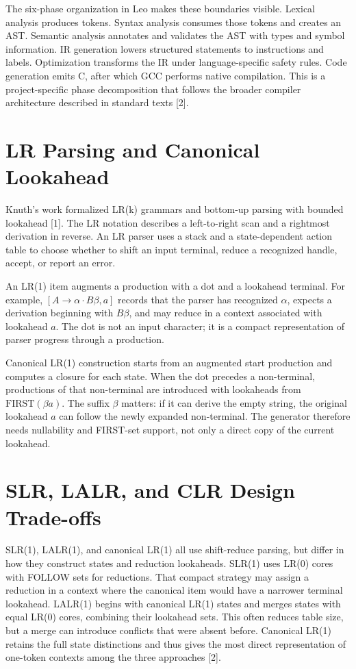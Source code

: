 \documentclass[12pt,a4paper,oneside]{report}
\begin{document}
The six-phase organization in Leo makes these boundaries visible. Lexical analysis produces tokens. Syntax analysis consumes those tokens and creates an AST. Semantic analysis annotates and validates the AST with types and symbol information. IR generation lowers structured statements to instructions and labels. Optimization transforms the IR under language-specific safety rules. Code generation emits C, after which GCC performs native compilation. This is a project-specific phase decomposition that follows the broader compiler architecture described in standard texts [2].

\section{LR Parsing and Canonical Lookahead}
Knuth's work formalized LR(k) grammars and bottom-up parsing with bounded lookahead [1]. The LR notation describes a left-to-right scan and a rightmost derivation in reverse. An LR parser uses a stack and a state-dependent action table to choose whether to shift an input terminal, reduce a recognized handle, accept, or report an error.

An LR(1) item augments a production with a dot and a lookahead terminal. For example, $[A\to\alpha\cdot B\beta,a]$ records that the parser has recognized $\alpha$, expects a derivation beginning with $B\beta$, and may reduce in a context associated with lookahead $a$. The dot is not an input character; it is a compact representation of parser progress through a production.

Canonical LR(1) construction starts from an augmented start production and computes a closure for each state. When the dot precedes a non-terminal, productions of that non-terminal are introduced with lookaheads from $\mathrm{FIRST}(\beta a)$. The suffix $\beta$ matters: if it can derive the empty string, the original lookahead $a$ can follow the newly expanded non-terminal. The generator therefore needs nullability and FIRST-set support, not only a direct copy of the current lookahead.

\section{SLR, LALR, and CLR Design Trade-offs}
SLR(1), LALR(1), and canonical LR(1) all use shift-reduce parsing, but differ in how they construct states and reduction lookaheads. SLR(1) uses LR(0) cores with FOLLOW sets for reductions. That compact strategy may assign a reduction in a context where the canonical item would have a narrower terminal lookahead. LALR(1) begins with canonical LR(1) states and merges states with equal LR(0) cores, combining their lookahead sets. This often reduces table size, but a merge can introduce conflicts that were absent before. Canonical LR(1) retains the full state distinctions and thus gives the most direct representation of one-token contexts among the three approaches [2].
\end{document}
